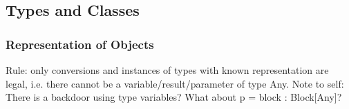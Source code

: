 \subsection{Types and Classes}

\subsubsection{Representation of Objects}

Rule: only conversions and instances of types with known representation are legal, i.e. there cannot be a variable/result/parameter of type Any.
Note to self: There is a backdoor using type variables?
What about p = block : Block[Any]?